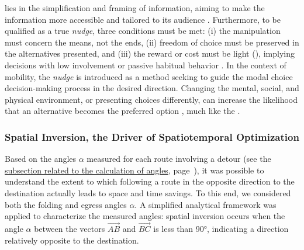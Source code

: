 \begin{refsegment}
{} lies in the simplification and framing of information, aiming to make the information more accessible and tailored to its audience \textcolor{blue}{\autocite[22]{lehner_nudging_2016}}. Furthermore, to be qualified as a true \textsl{nudge}, three conditions must be met: (i) the manipulation must concern the means, not the ends, (ii) freedom of choice must be preserved in the alternatives presented, and (iii) the reward or cost must be light (), implying decisions with low involvement or passive habitual behavior \textcolor{blue}{\autocite[199]{rachlin_choice_2015}}. In the context of mobility, the \textsl{nudge} is introduced as a method seeking to guide the modal choice decision-making process in the desired direction. Changing the mental, social, and physical environment, or presenting choices differently, can increase the likelihood that an alternative becomes the preferred option \textcolor{blue}{\autocite[12]{mont_nudging_2014}}, much like the .%

\subsubsection*{Spatial Inversion, the Driver of Spatiotemporal Optimization
    \label{chap5:inversion-spatiale-optimisation}
    }
 
Based on the angles $\alpha$ measured for each route involving a detour (see the \hyperref[chap5:calcul-angles-detours]{subsection related to the calculation of angles}, page~\pageref{chap5:calcul-angles-detours}), it was possible to understand the extent to which following a route in the opposite direction to the destination actually leads to space and time savings. To this end, we considered both the folding and egress angles $\alpha$. A simplified analytical framework was applied to characterize the measured angles: spatial inversion occurs when the angle $\alpha$ between the vectors $\vec{AB}$ and $\vec{BC}$ is less than 90°, indicating a direction relatively opposite to the destination.%


\end{refsegment}
